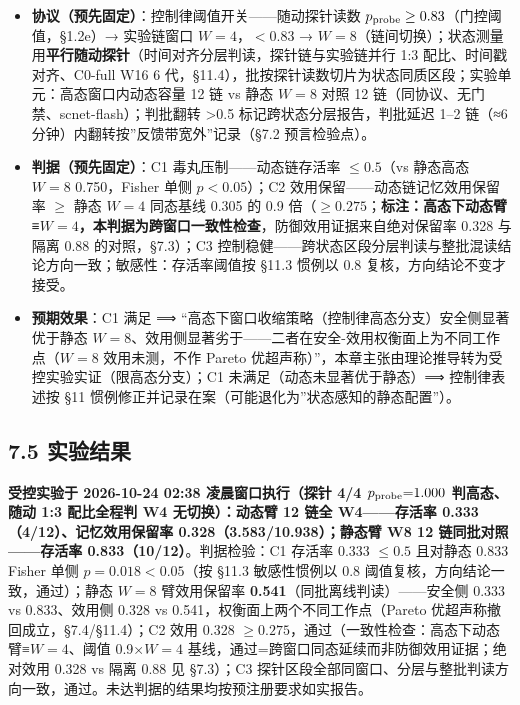 \documentclass[
]{ctexart}
\providecommand{\tightlist}{%
  \setlength{\itemsep}{0pt}\setlength{\parskip}{0pt}}
\begin{document}
\begin{itemize}
\tightlist
\item
  \textbf{协议（预先固定）}：控制律阈值开关------随动探针读数
  \(p_{\rm probe}\ge0.83\)（门控阈值，§1.2e）→ 实验链窗口
  \(W{=}4\)，\(<0.83\) →
  \(W{=}8\)（链间切换）；状态测量用\textbf{平行随动探针}（时间对齐分层判读，探针链与实验链并行
  1:3 配比、时间戳对齐、C0-full W16 6
  代，§11.4），批按探针读数切片为状态同质区段；实验单元：高态窗口内动态容量
  12 链 vs 静态 \(W{=}8\) 对照 12
  链（同协议、无门禁、scnet-flash）；判批翻转 \textgreater0.5
  标记跨状态分层报告，判批延迟 1--2 链（≈6
  分钟）内翻转按''反馈带宽外''记录（§7.2 预言检验点）。
\item
  \textbf{判据（预先固定）}：C1 毒丸压制------动态链存活率
  \(\le0.5\)（vs 静态高态 \(W{=}8\) 0.750，Fisher 单侧 \(p<0.05\)）；C2
  效用保留------动态链记忆效用保留率 \(\ge\) 静态 \(W{=}4\) 同态基线
  0.305 的 0.9
  倍（\(\ge0.275\)；\textbf{标注：高态下动态臂≡\(W{=}4\)，本判据为跨窗口一致性检查}，防御效用证据来自绝对保留率
  0.328 与隔离 0.88 的对照，§7.3）；C3
  控制稳健------跨状态区段分层判读与整批混读结论方向一致；敏感性：存活率阈值按
  §11.3 惯例以 0.8 复核，方向结论不变才接受。
\item
  \textbf{预期效果}：C1 满足 ⟹
  ``高态下窗口收缩策略（控制律高态分支）安全侧显著优于静态
  \(W{=}8\)、效用侧显著劣于------二者在安全-效用权衡面上为不同工作点（\(W{=}8\)
  效用未测，不作 Pareto
  优超声称）''，本章主张由理论推导转为受控实验实证（限高态分支）；C1
  未满足（动态未显著优于静态）⟹ 控制律表述按 §11
  惯例修正并记录在案（可能退化为''状态感知的静态配置''）。
\end{itemize}

\subsection{7.5 实验结果}\label{ux5b9eux9a8cux7ed3ux679c}

\textbf{受控实验于 2026-10-24 02:38 凌晨窗口执行（探针 4/4
\(p_{\rm probe}{=}1.000\) 判高态、随动 1:3 配比全程判 W4
无切换）：动态臂 12 链全 W4------存活率 0.333（4/12）、记忆效用保留率
0.328（3.583/10.938）；静态臂 W8 12 链同批对照------存活率
0.833（10/12）}。判据检验：C1 存活率 0.333 \(\le0.5\) 且对静态 0.833
Fisher 单侧 \(p{=}0.018<0.05\)（按 §11.3 敏感性惯例以 0.8
阈值复核，方向结论一致，通过）；静态 \(W{=}8\) 臂效用保留率
\textbf{0.541}（同批离线判读）------安全侧 0.333 vs 0.833、效用侧 0.328
vs 0.541，权衡面上两个不同工作点（Pareto
优超声称撤回成立，§7.4/§11.4）；C2 效用 0.328
\(\ge0.275\)，通过（一致性检查：高态下动态臂≡\(W{=}4\)、阈值
0.9×\(W{=}4\) 基线，通过=跨窗口同态延续而非防御效用证据；绝对效用 0.328
vs 隔离 0.88 见 §7.3）；C3
探针区段全部同窗口、分层与整批判读方向一致，通过。未达判据的结果均按预注册要求如实报告。
\end{document}
